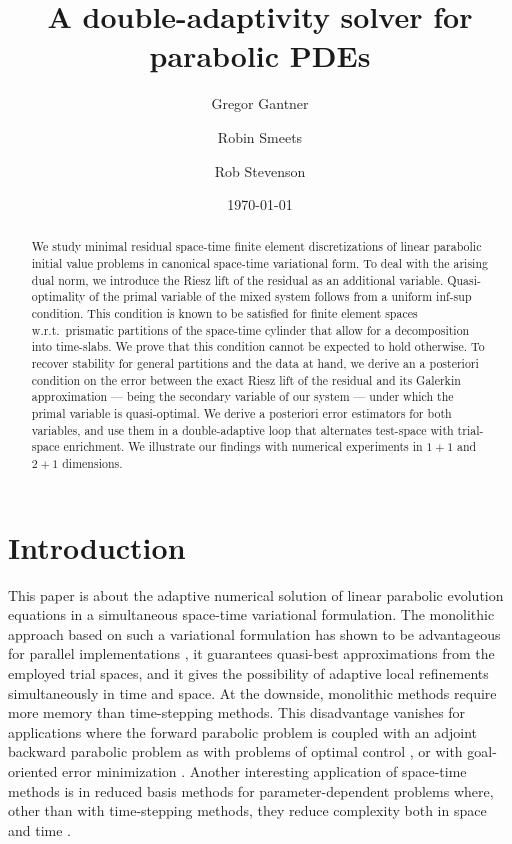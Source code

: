 \documentclass{amsart}
\title{A double-adaptivity solver for parabolic PDEs}
\date{\today}
\author{Gregor Gantner}
\author{Robin Smeets}
\author{Rob Stevenson}
\numberwithin{equation}{section}
\newcommand{\1}{\mathbb 1}
\begin{document}
\begin{abstract} We study minimal residual space-time finite element discretizations of linear parabolic initial value problems in canonical space-time variational form.
To deal with the arising dual norm, we introduce the Riesz lift of the residual as an additional variable.
Quasi-optimality of the primal variable of the mixed system follows from a uniform inf-sup condition.
This condition is known to be satisfied for finite element spaces w.r.t.~prismatic partitions of the space-time cylinder that allow for a decomposition into time-slabs.
We prove that this condition cannot be expected to hold otherwise.
To recover stability for general partitions and the data at hand, we derive an a posteriori condition on the error between the exact Riesz lift of the residual and its Galerkin approximation --- being the secondary variable of our system --- under which 
the primal variable is quasi-optimal.
We derive a posteriori error estimators for both variables, and use them in a double-adaptive loop that alternates test-space with trial-space enrichment. 
We illustrate our findings with numerical experiments in \(1+1\) and \(2+1\) dimensions.
\end{abstract}
\maketitle

\section{Introduction}
This paper is about the adaptive numerical solution of linear parabolic evolution equations in a simultaneous space-time variational formulation.
The monolithic approach based on such a variational formulation has shown to be advantageous for parallel implementations
\cite{169.06,306.65,169.065}, it guarantees quasi-best approximations from the employed trial spaces, and it gives the possibility of adaptive local refinements 
 simultaneously in time and space. At the downside, monolithic methods require more memory than time-stepping methods. This disadvantage vanishes for applications where the forward parabolic problem is coupled with an adjoint backward parabolic problem as with
problems of optimal control \cite{169.053, 19.96, 75.292,75.2573}, or with goal-oriented error minimization \cite{169.052}. Another interesting application of space-time methods is in reduced basis methods for parameter-dependent problems where, other than with time-stepping methods, they reduce complexity both in space and time \cite{75.528, 75.292,138.24}.
\end{document}
